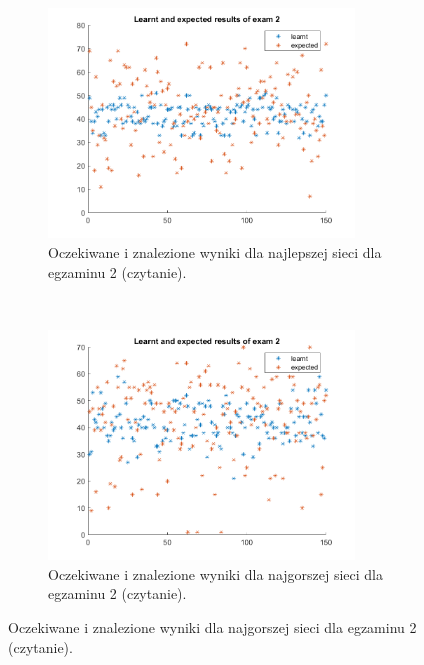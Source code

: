\documentclass[12pt]{article}
\begin{document}
\begin{figure}[H]
\begin{subfigure}[t]{0.48\textwidth} 
\centering
\includegraphics[height=2.4in]{best_results_2.png}
\caption{Oczekiwane i znalezione wyniki dla najlepszej sieci dla egzaminu 2 (czytanie).}
\end{subfigure}
~~
\begin{subfigure}[t]{0.48\textwidth} 
\centering
\includegraphics[height=2.4in]{worst_exam_2.png}
\caption{Oczekiwane i znalezione wyniki dla najgorszej sieci dla egzaminu 2 (czytanie).}
\end{subfigure}


\end{figure}
\end{document}

